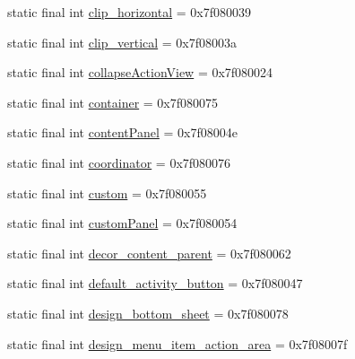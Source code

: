 \begin{CompactItemize}
\item 
static final int \hyperlink{classandroid_1_1support_1_1graphics_1_1drawable_1_1animated_1_1_r_1_1id_13dbe0b314c27b6e27ac19470d341e38}{clip\_\-horizontal} = 0x7f080039
\item 
static final int \hyperlink{classandroid_1_1support_1_1graphics_1_1drawable_1_1animated_1_1_r_1_1id_e726d3de554b7e697002750330ae3c1d}{clip\_\-vertical} = 0x7f08003a
\item 
static final int \hyperlink{classandroid_1_1support_1_1graphics_1_1drawable_1_1animated_1_1_r_1_1id_975d74e109603b532b66187dbd4e5d4a}{collapseActionView} = 0x7f080024
\item 
static final int \hyperlink{classandroid_1_1support_1_1graphics_1_1drawable_1_1animated_1_1_r_1_1id_d72cce8430480532c4a063f7815ed7cb}{container} = 0x7f080075
\item 
static final int \hyperlink{classandroid_1_1support_1_1graphics_1_1drawable_1_1animated_1_1_r_1_1id_53afe1986a999a71ba8ed95f27dc2f65}{contentPanel} = 0x7f08004e
\item 
static final int \hyperlink{classandroid_1_1support_1_1graphics_1_1drawable_1_1animated_1_1_r_1_1id_e97039dbdeb4be6ed1886beac2639ac2}{coordinator} = 0x7f080076
\item 
static final int \hyperlink{classandroid_1_1support_1_1graphics_1_1drawable_1_1animated_1_1_r_1_1id_7882cd29792180a55eddba12ffd315d0}{custom} = 0x7f080055
\item 
static final int \hyperlink{classandroid_1_1support_1_1graphics_1_1drawable_1_1animated_1_1_r_1_1id_a2cd3937e59c09bee81015d22dd5f1a5}{customPanel} = 0x7f080054
\item 
static final int \hyperlink{classandroid_1_1support_1_1graphics_1_1drawable_1_1animated_1_1_r_1_1id_2f426070b2f8afeb416e9bd1456a2382}{decor\_\-content\_\-parent} = 0x7f080062
\item 
static final int \hyperlink{classandroid_1_1support_1_1graphics_1_1drawable_1_1animated_1_1_r_1_1id_46a2c947add79404cc3520114a3cf931}{default\_\-activity\_\-button} = 0x7f080047
\item 
static final int \hyperlink{classandroid_1_1support_1_1graphics_1_1drawable_1_1animated_1_1_r_1_1id_a7b97bc77619cd499776130ecb4dcf61}{design\_\-bottom\_\-sheet} = 0x7f080078
\item 
static final int \hyperlink{classandroid_1_1support_1_1graphics_1_1drawable_1_1animated_1_1_r_1_1id_4c2243a9115f5c1b96ec0c8c5f037b32}{design\_\-menu\_\-item\_\-action\_\-area} = 0x7f08007f
\item 

\end{CompactItemize}
